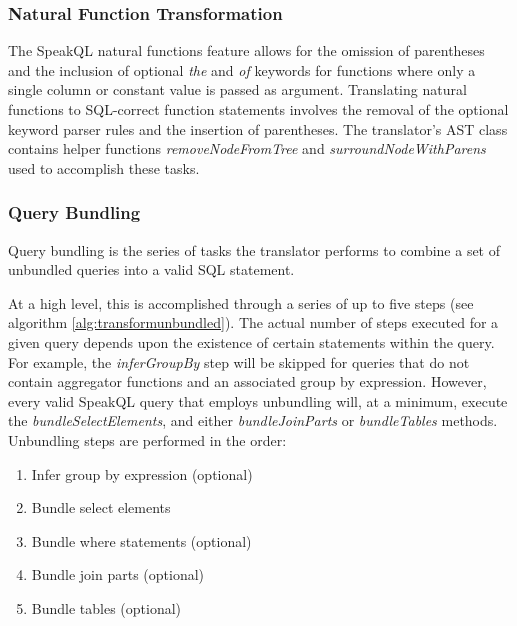 \ReorderModifiersAlgorithm

\subsubsection{Natural Function Transformation}

The SpeakQL natural functions feature allows for the omission of parentheses and the inclusion of optional \emph{the} and \emph{of} keywords for functions where only a single column or constant value is passed as argument. Translating natural functions to SQL-correct function statements involves the removal of the optional keyword parser rules and the insertion of parentheses. The translator's AST class contains helper functions \emph{removeNodeFromTree} and \emph{surroundNodeWithParens} used to accomplish these tasks.


\subsubsection{Query Bundling}

Query bundling is the series of tasks the translator performs to combine a set of unbundled queries into a valid SQL statement. 
  
\TransformUnbundledQuery

At a high level, this is accomplished through a series of up to five steps (see algorithm \ref{alg:transformunbundled}). The actual number of steps executed for a given query depends upon the existence of certain statements within the query. For example, the \emph{inferGroupBy} step will be skipped for queries that do not contain aggregator functions and an associated group by expression. However, every valid SpeakQL query that employs unbundling will, at a minimum, execute the \emph{bundleSelectElements}, and either \emph{bundleJoinParts} or \emph{bundleTables} methods. Unbundling steps are performed in the order:

\begin{enumerate}
  \item Infer group by expression (optional)
  \item Bundle select elements
  \item Bundle where statements (optional)
  \item Bundle join parts (optional)
  \item Bundle tables (optional)
\end{enumerate}

